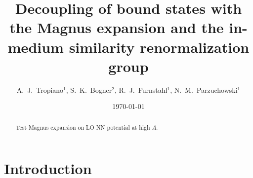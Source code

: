 \documentclass[preprintnumbers,floatfix,aps,prc,preprint]{revtex4-1}
\begin{document}
\title{Decoupling of bound states with the Magnus expansion and the in-medium similarity renormalization group}

\author{A.~J.~Tropiano$^{1}$,
        S.~K.~Bogner$^{2}$,
        R.~J.~Furnstahl$^{1}$,
        N.~M.~Parzuchowski$^{1}$}

\date{\today}

\begin{abstract}
Test Magnus expansion on LO NN potential at high $\Lambda$.
\end{abstract}

\maketitle

\tableofcontents

\newpage

\section{Introduction}
\label{sec:intro}
\end{document}
